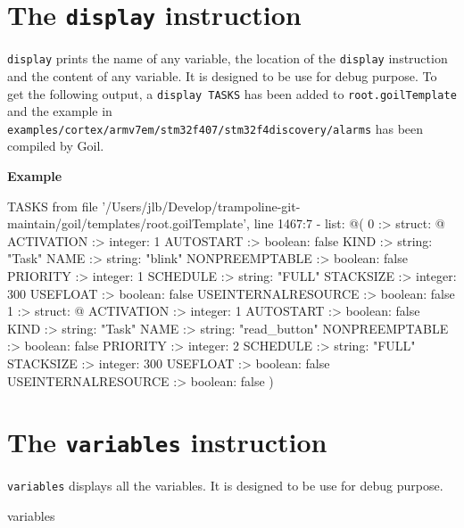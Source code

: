 \documentclass[10pt,openright,twosides]{report}
\newcommand{\gtlinline}[1]{\colorbox{light-blue}{\lstinline[language=gtl]{#1}}}
\newcommand{\example}{\vspace{.75em}\noindent\textbf{Example}\vspace{0em}}
\begin{document}
\section{The \texttt{display} instruction}

\gtlinline{display} prints the name of any variable, the location of the \gtlinline{display} instruction and the content of any variable. It is designed to be use for debug purpose. To get the following output, a \gtlinline{display TASKS} has been added to \texttt{\footnotesize root.goilTemplate} and the example in \texttt{\footnotesize examples/cortex/\-armv7em/stm32f407/stm32f4discovery/alarms} has been compiled by Goil.

\example
\begin{console}
TASKS from file '/Users/jlb/Develop/trampoline-git-maintain/goil/templates/root.goilTemplate', line 1467:7
  - list: @(
    0 :>
        struct: @{
            ACTIVATION :>
                integer: 1
            AUTOSTART :>
                boolean: false
            KIND :>
                string: "Task"
            NAME :>
                string: "blink"
            NONPREEMPTABLE :>
                boolean: false
            PRIORITY :>
                integer: 1
            SCHEDULE :>
                string: "FULL"
            STACKSIZE :>
                integer: 300
            USEFLOAT :>
                boolean: false
            USEINTERNALRESOURCE :>
                boolean: false
        }
    1 :>
        struct: @{
            ACTIVATION :>
                integer: 1
            AUTOSTART :>
                boolean: false
            KIND :>
                string: "Task"
            NAME :>
                string: "read_button"
            NONPREEMPTABLE :>
                boolean: false
            PRIORITY :>
                integer: 2
            SCHEDULE :>
                string: "FULL"
            STACKSIZE :>
                integer: 300
            USEFLOAT :>
                boolean: false
            USEINTERNALRESOURCE :>
                boolean: false
        }
)
\end{console}

\section{The \texttt{variables} instruction}

\gtlinline{variables} displays all the variables. It is designed to be use for debug purpose.

\begin{gtl}
variables
\end{gtl}
\end{document}
